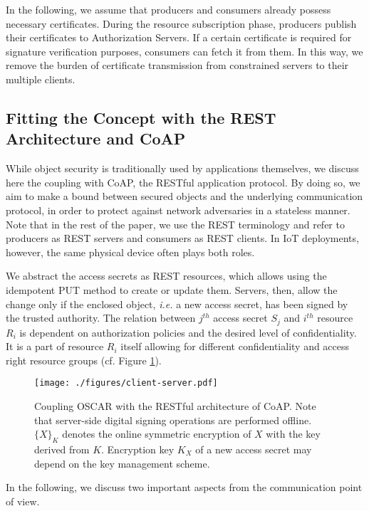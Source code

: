 \documentclass[conference]{IEEEtran}
\begin{document}
In the following, we assume that producers and consumers already possess necessary certificates. 
During the resource subscription phase, producers publish their certificates to
Authorization Servers. If a certain certificate is required for signature
verification purposes, consumers can fetch it from them. In this way, we remove the burden of certificate transmission from constrained servers to their multiple clients.



\subsection{Fitting the Concept with the REST Architecture and CoAP}
\label{coupling-with-coap}
While object security is traditionally used by applications themselves, we
discuss here the coupling with CoAP, the RESTful application protocol. By doing
so, we aim to make a bound between secured objects and the underlying communication
protocol, in order to protect against network adversaries in a stateless manner.
Note that in the rest of the paper, we use the REST terminology and
refer to producers as REST servers and consumers as REST clients. 
In IoT deployments, however, the same physical device often plays both roles. 




We abstract the access secrets as REST resources, which allows using the
idempotent PUT method to create or update them. Servers, then, allow the change
only if the enclosed object, \emph{i.e.} a new access secret, has been signed
by the trusted authority. The relation
between $j^{th}$ access secret $S_j$ and $i^{th}$ resource $R_i$ is dependent
on authorization policies and the desired level of confidentiality. It is a
part of resource $R_i$ itself allowing for different confidentiality and
access right resource groups (cf. Figure \ref{fig:client-server}).


\begin{figure}[htbp]
\centering
\texttt{[image: ./figures/client-server.pdf]}
\caption{Coupling OSCAR with the RESTful architecture of CoAP. Note that
  server-side digital signing operations are performed offline.  $\{X\}_K$
  denotes the online symmetric encryption of $X$ with the key derived from
  $K$. Encryption key $K_X$ of a new access secret  may depend on the key management scheme.}
\label{fig:client-server}
\end{figure}


In the following, we discuss two important aspects from the communication point of view. 
\end{document}
